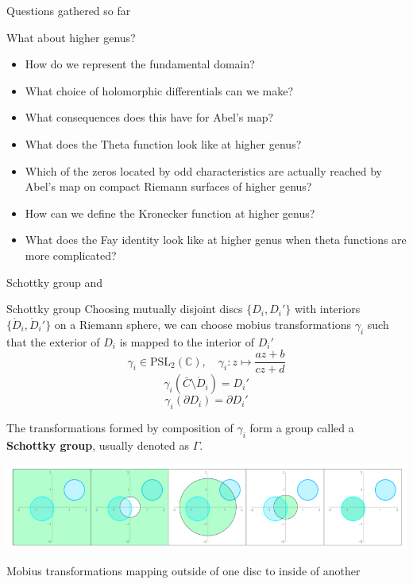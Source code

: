 \documentclass[11pt,aspectratio=169]{beamer}
\begin{document}
\begin{frame}{Questions gathered so far}
    {
        \vspace*{\fill}
        \begin{block}{What about higher genus?}
            \begin{itemize}
                \item How do we represent the fundamental domain?
                \item What choice of holomorphic differentials can we make?
                \item What consequences does this have for Abel's map?
                \item What does the Theta function look like at higher genus?
                \item Which of the zeros located by odd characteristics are actually reached by Abel's map on compact Riemann surfaces of higher genus?
                \item How can we define the Kronecker function at higher genus?
                \item What does the Fay identity look like at higher genus when theta functions are more complicated?
            \end{itemize}
        \end{block}
        \vspace*{\fill}
    }
\end{frame}

\begin{frame}{Schottky group}{\tiny \cite{ComputationalSchottky} and \cite{Cha22}}
    \begin{block}{Schottky group}
        Choosing mutually disjoint discs $\{D_i,D_i'\}$ with interiors $\{\mathring{D}_i,\mathring{D}_i'\}$ on a Riemann sphere,
        we can choose mobius transformations $\gamma_i$ such that the exterior of $D_i$ is mapped to the interior of $D_i'$
        \[\gamma_i \in \text{PSL}_2(\mathbb C) , \quad \gamma_i : z \mapsto \frac{az+b}{cz+d}\]
        \[\gamma_i(\bar C \setminus \mathring{D}_i) = D_i'\]
        \[\gamma_i(\partial D_i) = \partial D_i'\]

        The transformations formed by composition of $\gamma_i$ form a group called a \textbf{Schottky group}, usually denoted as $\Gamma$.
    \end{block}

    \center{}
    \includegraphics[width=0.7\columnwidth]{assets/ChanSchottkyGroup.png}

    \tiny Mobius transformations mapping outside of one disc to inside of another

    \cite{Cha22}
\end{frame}
\end{document}
